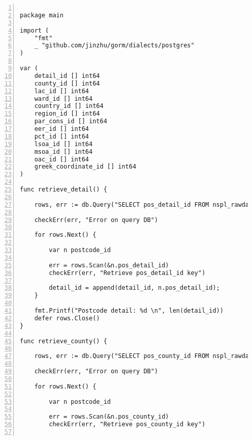 \lstset{basicstyle=\ttfamily\tiny}  
\begin{lstlisting}[breaklines, frame=single, numbers=left, caption={Resource Table Key Retrieval Function.}, label=commandline-02]

package main

import (
	"fmt" 
	_ "github.com/jinzhu/gorm/dialects/postgres"
)

var (
	detail_id [] int64
	county_id [] int64 
	lac_id [] int64 
	ward_id [] int64 
	country_id [] int64 
	region_id [] int64 
	par_cons_id [] int64 
	eer_id [] int64 
	pct_id [] int64 
	lsoa_id [] int64 
	msoa_id [] int64 
	oac_id [] int64 
	greek_coordinate_id [] int64 
)

func retrieve_detail() {

	rows, err := db.Query("SELECT pos_detail_id FROM nspl_rawdata AS rawdata JOIN postcode_detail AS detail ON detail.pos1 = rawdata.postcode1 AND detail.pos2 = rawdata.postcode2 AND detail.pos3 = rawdata.postcode3 AND detail.pos_date_introduce = rawdata.date_introduce AND detail.pos_usertype = rawdata.usertype AND detail.position_quality = rawdata.position_quality AND detail.pos_spatial_accuracy = rawdata.spatial_accuracy AND     detail.pos_location = rawdata.location AND detail.pos_socrataid = rawdata.socrataid AND detail.pos_last_upload = rawdata.last_upload;" )
	
	checkErr(err, "Error on query DB")	
	
	for rows.Next() {
	
		var n postcode_id
		
		err = rows.Scan(&n.pos_detail_id)
		checkErr(err, "Retrieve pos_detail_id key")
		
		detail_id = append(detail_id, n.pos_detail_id); 
	}

	fmt.Printf("Postcode detail: %d \n", len(detail_id))
	defer rows.Close()
}

func retrieve_county() {

	rows, err := db.Query("SELECT pos_county_id FROM nspl_rawdata AS rawdata JOIN postcode_county AS county ON county.pos_county_code = rawdata.countycode AND county.pos_county_name = rawdata.countyname JOIN postcode_local_authority_county AS lac ON lac.pos_lac_code = rawdata.county_lac AND lac.pos_lac_name = rawdata.county_lan;" )
	
	checkErr(err, "Error on query DB")	
	
	for rows.Next() {
	
		var n postcode_id
		
		err = rows.Scan(&n.pos_county_id)
		checkErr(err, "Retrieve pos_county_id key")
		

\end{lstlisting}
